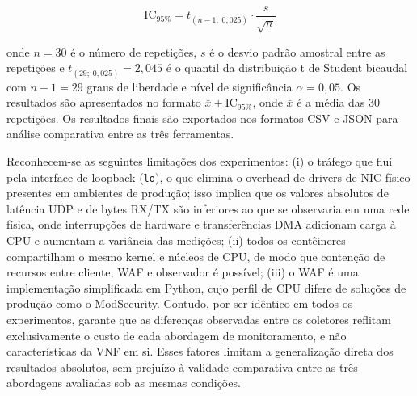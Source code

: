 \begin{equation}
\text{IC}_{95\%} = t_{(n-1;\;0{,}025)} \cdot \frac{s}{\sqrt{n}}
\label{eq:ic95}
\end{equation}

\noindent onde $n = 30$ é o número de repetições, $s$ é o desvio padrão amostral entre as repetições e $t_{(29;\;0{,}025)} = 2{,}045$ é o quantil da distribuição t de Student bicaudal com $n - 1 = 29$ graus de liberdade e nível de significância $\alpha = 0{,}05$. Os resultados são apresentados no formato $\bar{x} \pm \text{IC}_{95\%}$, onde $\bar{x}$ é a média das 30 repetições. Os resultados finais são exportados nos formatos CSV e JSON para análise comparativa entre as três ferramentas.

Reconhecem-se as seguintes limitações dos experimentos: (i) o tráfego que flui pela interface de loopback (\texttt{lo}), o que elimina o overhead de drivers de NIC físico presentes em ambientes de produção; isso implica que os valores absolutos de latência UDP e de bytes RX/TX são inferiores ao que se observaria em uma rede física, onde interrupções de hardware e transferências DMA adicionam carga à CPU e aumentam a variância das medições; (ii) todos os contêineres compartilham o mesmo kernel e núcleos de CPU, de modo que contenção de recursos entre cliente, WAF e observador é possível; (iii) o WAF é uma implementação simplificada em Python, cujo perfil de CPU difere de soluções de produção como o ModSecurity. Contudo, por ser idêntico em todos os experimentos, garante que as diferenças observadas entre os coletores reflitam exclusivamente o custo de cada abordagem de monitoramento, e não características da VNF em si. Esses fatores limitam a generalização direta dos resultados absolutos, sem prejuízo à validade comparativa entre as três abordagens avaliadas sob as mesmas condições.
